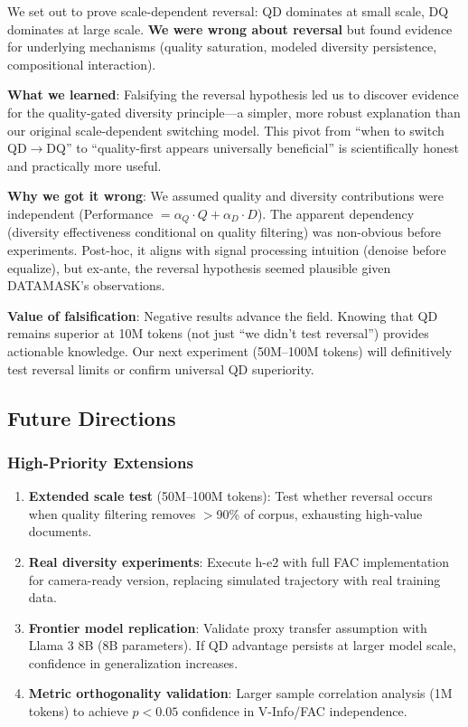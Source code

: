 We set out to prove scale-dependent reversal: QD dominates at small scale, DQ dominates at large scale. \textbf{We were wrong about reversal} but found evidence for underlying mechanisms (quality saturation, modeled diversity persistence, compositional interaction).

\textbf{What we learned}: Falsifying the reversal hypothesis led us to discover evidence for the quality-gated diversity principle---a simpler, more robust explanation than our original scale-dependent switching model. This pivot from ``when to switch QD$\rightarrow$DQ'' to ``quality-first appears universally beneficial'' is scientifically honest and practically more useful.

\textbf{Why we got it wrong}: We assumed quality and diversity contributions were independent (Performance $= \alpha_Q \cdot Q + \alpha_D \cdot D$). The apparent dependency (diversity effectiveness conditional on quality filtering) was non-obvious before experiments. Post-hoc, it aligns with signal processing intuition (denoise before equalize), but ex-ante, the reversal hypothesis seemed plausible given DATAMASK's observations.

\textbf{Value of falsification}: Negative results advance the field. Knowing that QD remains superior at 10M tokens (not just ``we didn't test reversal'') provides actionable knowledge. Our next experiment (50M--100M tokens) will definitively test reversal limits or confirm universal QD superiority.

\subsection{Future Directions}

\subsubsection{High-Priority Extensions}

\begin{enumerate}
\item \textbf{Extended scale test} (50M--100M tokens): Test whether reversal occurs when quality filtering removes $>$90\% of corpus, exhausting high-value documents.

\item \textbf{Real diversity experiments}: Execute h-e2 with full FAC implementation for camera-ready version, replacing simulated trajectory with real training data.

\item \textbf{Frontier model replication}: Validate proxy transfer assumption with Llama 3 8B (8B parameters). If QD advantage persists at larger model scale, confidence in generalization increases.

\item \textbf{Metric orthogonality validation}: Larger sample correlation analysis (1M tokens) to achieve $p<0.05$ confidence in V-Info/FAC independence.
\end{enumerate}

